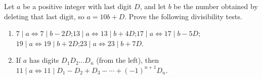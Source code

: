 Let $a$ be a positive integer with last digit $D$, and let $b$ be the number obtained by deleting that last digit, so $a=10b+D$. Prove the following divisibility tests.
\begin{enumerate}
\item[(a)] $7\mid a\iff7\mid b-2D$;\quad $13\mid a\iff13\mid b+4D$;\quad $17\mid a\iff17\mid b-5D$;\quad $19\mid a\iff19\mid b+2D$;\quad $23\mid a\iff23\mid b+7D$.
\item[(b)] If $a$ has digits $D_1D_2\ldots D_n$ (from the left), then $11\mid a\iff11\mid D_1-D_2+D_3-\cdots+(-1)^{n+1}D_n$.
\end{enumerate}

